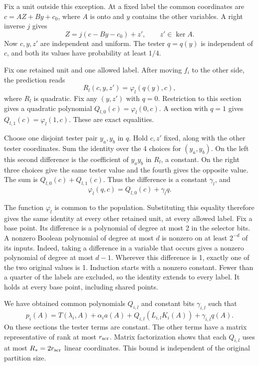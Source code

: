 Fix a unit outside this exception. At a fixed label the common coordinates
are \(c=AZ+By+c_0\), where \(A\) is onto and \(y\) contains the other
variables. A right inverse \(j\) gives
\[
 Z=j(c-By-c_0)+z',\qquad z'\in\ker A.
\]
Now \(c,y,z'\) are independent and uniform. The tester \(q=q(y)\)
is independent of \(c\), and both its values have probability at least
\(1/4\).

Fix one retained unit and one allowed label. After moving \(f_i\)
to the other side, the prediction reads
\[
 R_l(c,y,z')=\varphi_l(q(y),c),
\]
where \(R_l\) is quadratic. Fix any \((y,z')\) with \(q=0\).
Restriction to this section gives a quadratic polynomial
\(Q_{l,0}(c)=\varphi_l(0,c)\). A section with \(q=1\) gives
\(Q_{l,1}(c)=\varphi_l(1,c)\). These are exact equalities.

Choose one disjoint tester pair \(y_a,y_b\) in \(q\). Hold \(c,z'\)
fixed, along with the other tester coordinates. Sum the identity
over the 4 choices for \((y_a,y_b)\). On the left this second difference
is the coefficient of \(y_ay_b\) in \(R_l\), a constant. On the right
three choices give the same tester value and the fourth gives the
opposite value. The sum is \(Q_{l,0}(c)+Q_{l,1}(c)\). Thus the difference is a constant
\(\gamma_l\), and
\[
 \varphi_l(q,c)=Q_{l,0}(c)+\gamma_l q.
\]

The function \(\varphi_l\) is common to the population. Substituting
this equality therefore gives the same identity at every other retained
unit, at every allowed label. Fix a base point. Its difference is a
polynomial of degree at most 2 in the selector bits. A nonzero Boolean
polynomial of degree at most \(d\) is nonzero on at least \(2^{-d}\)
of its inputs. Indeed, taking a difference in a variable that occurs
gives a nonzero polynomial of degree at most \(d-1\). Wherever this
difference is 1, exactly one of the two original values is 1.
Induction starts with a nonzero constant. Fewer than a quarter of
the labels are excluded, so the identity extends to every label. It
holds at every base point, including shared points.

We have obtained common polynomials \(Q_{i,l}\) and constant bits
\(\gamma_{i,l}\) such that
\begin{equation}\label{eq:fitted-prediction}
 p_i(A)=T(\lambda_i,A)+\alpha_i a(A)
       +Q_{i,l}(L_{i,l}K_i(A))+\gamma_{i,l}q(A).
\end{equation}
On these sections the tester terms are constant. The other terms
have a matrix representative of rank at most \(r_{\rm scr}\).
Matrix factorization shows that each \(Q_{i,l}\) uses at most
\(R_*=2r_{\rm scr}\) linear coordinates. This bound is independent of
the original partition size.

